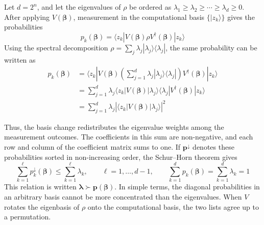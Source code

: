 \begin{definition}
    Let $d=2^n$, and let the eigenvalues of $\rho$ be ordered as $\lambda_1\geq\lambda_2\geq\cdots\geq\lambda_d\geq0$. After applying $V(\boldsymbol{\beta})$, measurement in the computational basis $\{|z_k\rangle\}$ gives the probabilities
    \begin{equation}
        p_k(\boldsymbol{\beta})
        =\langle z_k|V(\boldsymbol{\beta})\rho
        V^\dagger(\boldsymbol{\beta})|z_k\rangle
    \end{equation}
    Using the spectral decomposition $\rho=\sum_j\lambda_j|\lambda_j\rangle\langle\lambda_j|$, the same probability can be written as
    \begin{equation}
        \begin{aligned}
            p_k(\boldsymbol{\beta}) & = \langle z_k|V(\boldsymbol{\beta}) \left( \sum_{j=1}^d \lambda_j |\lambda_j\rangle\langle\lambda_j| \right) V^\dagger(\boldsymbol{\beta})|z_k\rangle \\
                                    & = \sum_{j=1}^d \lambda_j \langle z_k|V(\boldsymbol{\beta})|\lambda_j\rangle \langle\lambda_j|V^\dagger(\boldsymbol{\beta})|z_k\rangle                 \\
                                    & = \sum_{j=1}^d \lambda_j \left| \langle z_k|V(\boldsymbol{\beta})|\lambda_j\rangle \right|^2
        \end{aligned}
        \label{eq:vqse_probability_mixing}
    \end{equation}


    Thus, the basis change redistributes the eigenvalue weights among the measurement outcomes. The coefficients in this sum are non-negative, and each row and column of the coefficient matrix sums to one.
    If $\mathbf{p}^{\downarrow}$ denotes these probabilities sorted in non-increasing order, the Schur--Horn theorem gives
    \begin{equation}
        \sum_{k=1}^{\ell}p_k^{\downarrow}(\boldsymbol{\beta})
        \leq \sum_{k=1}^{\ell}\lambda_k,
        \qquad \ell=1,\ldots,d-1,
        \qquad
        \sum_{k=1}^{d}p_k(\boldsymbol{\beta})=\sum_{k=1}^{d}\lambda_k=1
        \label{eq:vqse_majorization}
    \end{equation}
    This relation is written $\boldsymbol{\lambda}\succ\mathbf{p}(\boldsymbol{\beta})$. In simple terms, the diagonal probabilities in an arbitrary basis cannot be more concentrated than the eigenvalues. When $V$ rotates the eigenbasis of $\rho$ onto the computational basis, the two lists agree up to a permutation.
\end{definition}

